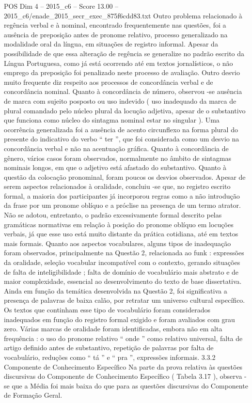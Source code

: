 \begin{textsample}{POS Dim 4 – 2015\_c6 – Score 13.00 – 2015\_c6/enade\_2015\_secr\_exec\_875f6cdd83.txt}
Outro problema relacionado à regência verbal e à nominal, encontrado frequentemente nas questões, foi a ausência de preposição antes de pronome relativo, processo generalizado na modalidade oral da língua, em situações de registro informal.
Apesar da possibilidade de que essa alteração de regência se generalize no padrão escrito da Língua Portuguesa, como já está ocorrendo até em textos jornalísticos, o não emprego da preposição foi penalizado neste processo de avaliação.
Outro desvio muito frequente diz respeito aos processos de concordância verbal e de concordância nominal.
Quanto à concordância de número, observou -se ausência de marca com sujeito posposto ou uso indevido ( uso inadequado da marca de plural comandado pelo núcleo plural da locução adjetiva, apesar de o substantivo que funciona como núcleo do sintagma nominal estar no singular ).
Uma ocorrência generalizada foi a ausência de acento circunflexo na forma plural do presente do indicativo do verbo “ ter ”, que foi considerada como um desvio na concordância verbal e não na acentuação gráfica.
Quanto à concordância de gênero, vários casos foram observados, normalmente no âmbito de sintagmas nominais longos, em que o adjetivo está afastado do substantivo.
Quanto à questão da colocação pronominal, foram poucos os desvios observados.
Apesar de serem aspectos relacionados à oralidade, concluiu -se que, no registro escrito formal, a maioria dos participantes já incorporou regras como a não introdução da frase por um pronome oblíquo e a próclise na presença de um termo atrator.
Não se adotou, entretanto, o padrão excessivamente formal descrito pelas gramáticas normativas em relação à posição do pronome oblíquo em locuções verbais, já que esse uso está muito distante da prática cotidiana, até em textos mais formais.
Quanto aos aspectos vocabulares, alguns tipos de inadequação foram observados, principalmente na Questão 2, relacionada ao funk : expressões da oralidade, seleção vocabular incompatível com o contexto, gerando situações de falta de inteligibilidade ; falta de domínio de vocabulário mais abstrato e de maior complexidade, essencial ao desenvolvimento do texto de base dissertativa.
Ainda em função da temática desenvolvida na Questão 2, foi significativa a presença de palavras de baixa calão, por retratar um universo cultural específico.
Os textos que continham esse tipo de vocabulário foram considerados inadequados em função do registro formal exigido e foram avaliados com grau zero.
Várias marcas de oralidade foram identificadas, embora não em alta frequência : o uso do pronome relativo “ onde ” como relativo universal, falta de artigo definido antes de substantivo, repetição de palavras por falta de vocabulário, reduções como “ tá ” e “ pra ”, expressões informais. 3.3.2 Componente de Conhecimento Específico Na parte da prova relativa às questões discursivas do Componente de Conhecimento Específico ( Tabela 3.17 ), observa -se que a Média foi mais baixa do que para as questões discursivas do Componente de Formação Geral.

\end{textsample}

